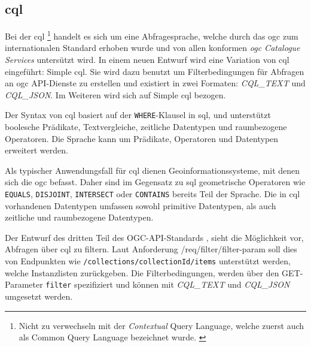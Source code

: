 \subsection{\acl{cql}}


Bei der \acf{cql} \footnote{Nicht zu verwechseln mit der \textit{Contextual} Query Language, welche
zuerst auch als Common Query Language bezeichnet wurde.
\parencite{thelibraryofcongressCQLContextual2023, ZINGGentle2003}} handelt es sich um eine
Abfragesprache, welche durch das \ac{ogc} zum internationalen Standard erhoben wurde und von allen
konformen \textit{\ac{ogc} Catalogue Services} untersützt wird.  In
einem neuen Entwurf  wird eine Variation von \ac{cql} eingeführt: Simple
\ac{cql}. Sie wird dazu benutzt um Filterbedingungen für Abfragen an \ac{ogc} API-Dienste zu
erstellen und existiert in zwei Formaten: \textit{CQL\_TEXT} und \textit{CQL\_JSON}.  Im
Weiteren wird sich auf Simple \ac{cql} bezogen.

Der Syntax von \ac{cql} basiert auf der \texttt{WHERE}-Klausel in \acs{sql}, und unterstützt
boolesche Prädikate, Textvergleiche, zeitliche Datentypen und raumbezogene Operatoren. Die Sprache
kann um Prädikate, Operatoren und Datentypen erweitert werden.

Als typischer Anwendungsfall für \ac{cql} dienen Geoinformationssysteme, mit denen sich die \ac{ogc}
befasst. Daher sind im Gegensatz zu \ac{sql} geometrische Operatoren wie \texttt{EQUALS},
\texttt{DISJOINT}, \texttt{INTERSECT} oder \texttt{CONTAINS} bereits Teil der Sprache. Die in
\ac{cql} vorhandenen Datentypen umfassen sowohl primitive Datentypen, als auch zeitliche und
raumbezogene Datentypen.

Der Entwurf des dritten Teil des OGC-API-Standards , sieht die
Möglichkeit vor, Abfragen über \ac{cql} zu filtern. Laut Anforderung /req/filter/filter-param soll
dies von Endpunkten wie \texttt{/collections/{collectionId}/items} unterstützt werden, welche
Instanzlisten zurückgeben. Die Filterbedingungen, werden über den GET-Parameter \texttt{filter}
spezifiziert und können mit \textit{CQL\_TEXT} und \textit{CQL\_JSON} umgesetzt werden.

